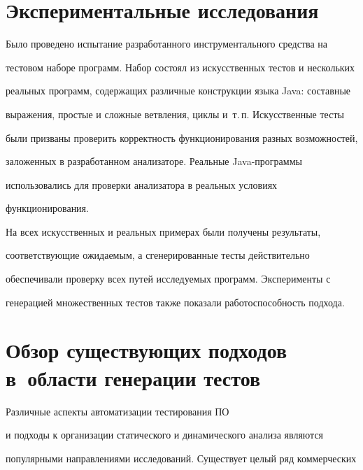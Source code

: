       \section{Экспериментальные исследования}





     Было проведено испытание разработанного инструментального средства на


тестовом наборе программ. Набор состоял из искусственных тестов и нескольких


реальных программ, содержащих различные конструкции языка Java: составные


выражения, простые и сложные ветвления, циклы и~т.\,п. Искусственные тесты


были призваны проверить корректность функционирования разных возможностей,


заложенных в разработанном анализаторе. Реальные Java-про\-грам\-мы


использовались для проверки анализатора в реальных условиях


функционирования.





     На всех искусственных и реальных примерах были получены результаты,


соответствующие ожидаемым, а сгенерированные тесты действительно


обеспечивали проверку всех путей исследуемых программ. Эксперименты с


генерацией множественных тестов также показали работоспособность подхода.










      \section{Обзор существующих подходов в~области генерации тестов}





     Различные аспекты автоматизации тестирования ПО


и подходы к организации статического и динамического анализа являются


популярными направлениями исследований. Существует целый ряд коммерческих


